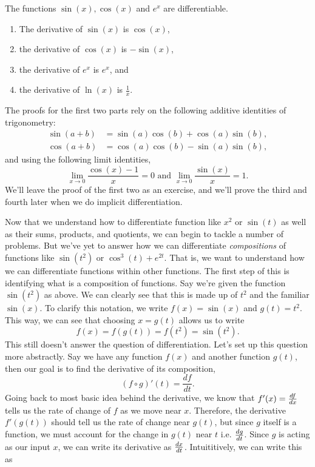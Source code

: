 \begin{prop}\label{SinCosExpDif}
  The functions $\sin(x), \cos(x)$ and $e^x$ are differentiable.
  \begin{enumerate}
\item The derivative of $\sin(x)$ is $\cos(x)$,
\item the derivative of $\cos(x)$ is $-\sin(x)$,
\item the derivative of $e^x$ is $e^x$, and
\item the derivative of $\ln(x)$ is $\frac{1}{x}$.
\end{enumerate}
\end{prop}
The proofs for the first two parts rely on the following additive identities of trigonometry:
\begin{align}
   \sin(a+b)&=\sin(a)\cos(b)+\cos(a)\sin(b),\\
   \cos(a+b)&=\cos(a)\cos(b)-\sin(a)\sin(b),
\end{align}
and using the following limit identities,
\begin{equation}
  \lim\limits_{x\to 0}\frac{\cos(x)-1}{x}=0 \text{ and } \lim\limits_{x\to 0}\frac{\sin(x)}{x} =1.
\end{equation}
We'll leave the proof of the first two as an exercise, and we'll prove the third and fourth later when we do implicit differentiation.

Now that we understand how to differentiate function like $x^2$ or $\sin(t)$ as well as their sums, products, and quotients, we can begin to tackle a number of problems. But we've yet to answer how we can differentiate \emph{compositions} of functions like $\sin(t^2)$ or $\cos^3(t) + e^{2t}$. That is, we want to understand how we can differentiate functions within other functions. The first step of this is identifying what is a composition of functions. Say we're given the function $\sin(t^2)$ as above. We can clearly see that this is made up of $t^2$ and the familiar $\sin(x)$. To clarify this notation, we write $f(x) = \sin(x)$ and $g(t) = t^2$.  This way, we can see that choosing $x = g(t)$ allows us to write
\[
f(x) = f(g(t)) = f(t^2) = \sin (t^2).
\]
This still doesn't answer the question of differentiation. Let's set up this question more abstractly. Say we have any function $f(x)$ and another function $g(t)$, then our goal is to find the derivative of its composition,
\[
(f\circ g)'(t) = \frac{df}{dt}.
\]
Going back to most basic idea behind the derivative, we know that $f'(x) = \frac{d f}{d x}$ tells us the rate of change of $f$ as we move near $x$. Therefore, the derivative $f'(g(t))$ should tell us the rate of change near $g(t)$, but since $g$ itself is a function, we must account for the change in $g(t)$ near $t$ i.e. $\frac{d g}{d t}$. Since $g$ is acting as our input $x$, we can write its derivative as $\frac{d x}{d t}$. Intuititively, we can write this as

